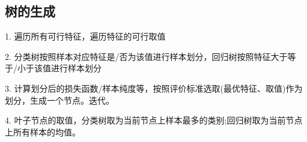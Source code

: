 \subsection{树的生成}
1. 遍历所有可行特征，遍历特征的可行取值

2. 分类树按照样本对应特征是/否为该值进行样本划分，回归树按照特征大于等于/小于该值进行样本划分

3. 计算划分后的损失函数/样本纯度等，按照评价标准选取(最优特征、取值)作为划分，生成一个节点。迭代。

4. 叶子节点的取值，分类树取为当前节点上样本最多的类别;回归树取为当前节点上所有样本的均值。

